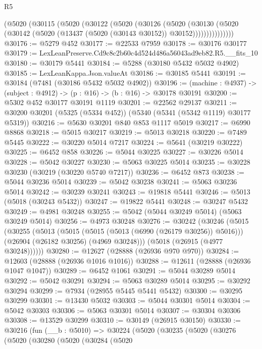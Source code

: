 \begin{lexlean}{R5}
\begin{coremodule}
          (@5020
            (@30115
              (@5020
                (@30122
                  (@5020
                    (@30126
                      (@5020
                        (@30130
                          (@5020
                            (@30142 (@5020 (@13437 (@5020 (@30143 @30152)) @30152)))))))))))))))
@30176 := @5279 @452
@30177 := @22533 @7959
@30178 := @30176 @30177
@30179 := LexLeanPreserve.Cd9c8c2b60c4d524d486a56043ad9eb82.R5.__fits_10
@30180 := @30179 @5441
@30184 := @5288 (@30180 @5432 @5032 @4902)
@30185 := LexLeanKappa.Json.valueAt
@30186 := @30185 @5441
@30191 := @30184 (@7481 (@30186 @5432 @5032 @4902))
@30196 := (machine : @4937) -> (subject : @4912) -> (p : @16) -> (b : @16) -> @30178 @30191
@30200 := @5302 @452 @30177 @30191 @1119
@30201 := @22562 @29137
@30211 := @30200 @30201 (@5325 (@5334 @452)) (@5340 (@5341 (@5342 @1119) @30177 @5319))
@30216 := @5630 @30201 @840 @853 @1117 @5019
@30217 := @6990 @8868
@30218 := @5015 @30217
@30219 := @5013 @30218
@30220 := @7489 @5445
@30222 := @30220 @5014 @7217
@30224 := @5641 (@30219 @30222)
@30225 := @6452 @858
@30226 := @5044 @30225
@30227 := @30226 @5014
@30228 := @5042 @30227
@30230 := @5063 @30225 @5014
@30235 := @30228 @30230 (@30219 (@30220 @5740 @7217))
@30236 := @6452 @873
@30238 := @5044 @30236 @5014
@30239 := @5042 @30238
@30241 := @5063 @30236 @5014
@30242 := @30239 @30241
@30243 := @19818 @5441
@30246 := @5013 (@5018 (@30243 @5432))
@30247 := @19822 @5441
@30248 := @30247 @5432
@30249 := @4981 @30248
@30255 := @5042 (@5044 @30249 @5014) (@5063 @30249 @5014)
@30256 := @4973 @30248
@30276 := @30242
    (@30246
      (@5015
        (@30255
          (@5013
            (@5015 (@5015 (@5013 (@6990 (@26179 @30256)) @5016)))
            (@26904 (@26182 @30256) (@4969 @30248)))
          (@5018 (@26915 (@4977 @30248))))))
@30280 := @12627 (@28888 (@26936 @970 @970))
@30284 := @12603 (@28888 (@26936 @1016 @1016))
@30288 := @12611 (@28888 (@26936 @1047 @1047))
@30289 := @6452 @1061
@30291 := @5044 @30289 @5014
@30292 := @5042 @30291
@30294 := @5063 @30289 @5014
@30295 := @30292 @30294
@30299 := @7934 (@28955 @5445 @5441 @5432)
@30300 := @30295 @30299
@30301 := @13430 @5032
@30303 := @5044 @30301 @5014
@30304 := @5042 @30303
@30306 := @5063 @30301 @5014
@30307 := @30304 @30306
@30308 := @13529 @30299
@30310 := @30149 (@26915 @30150)
@30330 := @30216
    (fun (__b : @5010) =>
    @30224
      (@5020
        (@30235
          (@5020
            (@30276
              (@5020
                (@30280
                  (@5020
                    (@30284
                      (@5020

\end{coremodule}
\end{lexlean}
